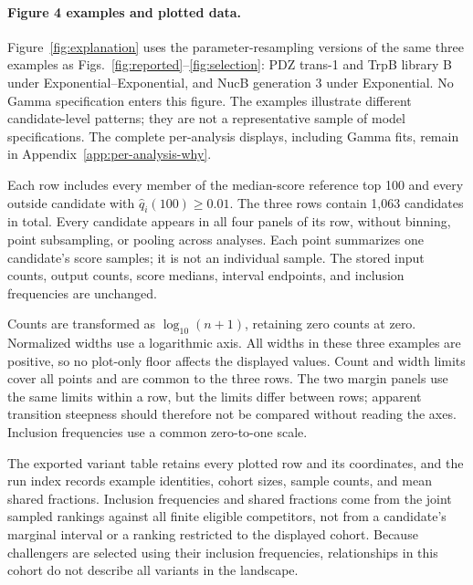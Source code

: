 \documentclass[11pt]{article}
\begin{document}
\paragraph{Figure 4 examples and plotted data.}
\label{app:figure-explanation}
Figure~\ref{fig:explanation} uses the parameter-resampling versions of the
same three examples as Figs.~\ref{fig:reported}--\ref{fig:selection}:
PDZ trans-1 and TrpB library B under Exponential--Exponential, and NucB
generation 3 under Exponential. No Gamma specification enters this figure.
The examples illustrate different candidate-level patterns; they are not
a representative sample of model specifications. The complete per-analysis
displays, including Gamma fits, remain in Appendix~\ref{app:per-analysis-why}.

Each row includes every member of the median-score reference top 100 and
every outside candidate with $\hat q_i(100)\geq0.01$. The three rows contain
1,063 candidates in total. Every candidate appears in all four panels of
its row, without binning, point subsampling, or pooling across analyses.
Each point summarizes one candidate's score samples; it is not an
individual sample. The stored input counts, output counts, score medians,
interval endpoints, and inclusion frequencies are unchanged.

Counts are transformed as $\log_{10}(n+1)$, retaining zero counts at zero.
Normalized widths use a logarithmic axis. All widths in these three examples
are positive, so no plot-only floor affects the displayed values. Count
and width limits cover all points and are common to the three rows.
The two margin panels use the same limits within a row, but the limits
differ between rows; apparent transition steepness should therefore not
be compared without reading the axes. Inclusion frequencies use a common
zero-to-one scale.

The exported variant table retains every plotted row and its coordinates,
and the run index records example identities, cohort sizes, sample counts,
and mean shared fractions. Inclusion frequencies and shared fractions come
from the joint sampled rankings against all finite eligible competitors,
not from a candidate's marginal interval or a ranking restricted to the
displayed cohort. Because challengers are selected using their inclusion
frequencies, relationships in this cohort do not describe all variants
in the landscape.
\end{document}
